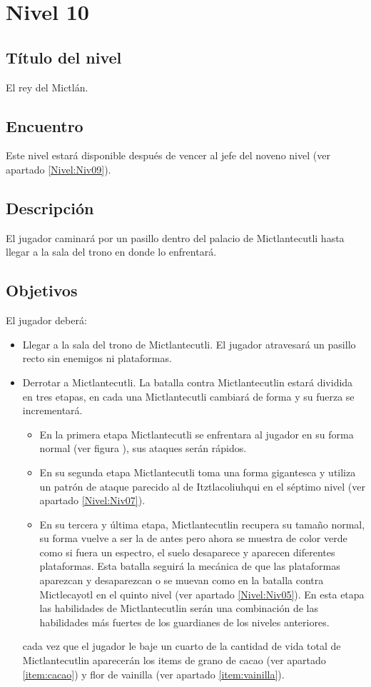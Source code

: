 \section{Nivel 10} \label{Nivel:Niv10}
	\subsection{Título del nivel}
	El rey del Mictlán.
	\subsection{Encuentro}
	Este nivel estará disponible después de vencer al jefe del noveno nivel (ver apartado \ref{Nivel:Niv09}). 
	\subsection{Descripción}
	El jugador caminará por un pasillo dentro del palacio de Mictlantecutli hasta llegar a la sala del trono en donde lo enfrentará.
	\subsection{Objetivos}
	El jugador deberá:
	\begin{itemize}
		\item Llegar a la sala del trono de Mictlantecutli. El jugador atravesará un pasillo recto sin enemigos ni plataformas. 
		\item Derrotar a Mictlantecutli. La batalla contra Mictlantecutlin estará dividida en tres etapas, en cada una Mictlantecutli cambiará de forma y su fuerza se incrementará. 
		\begin{itemize}
			\item En la primera etapa Mictlantecutli se enfrentara al jugador en su forma normal (ver figura ), sus ataques serán rápidos. 
			\item En su segunda etapa Mictlantecutli toma una forma gigantesca y utiliza un patrón de ataque parecido al de Itztlacoliuhqui en el séptimo nivel (ver apartado \ref {Nivel:Niv07}). 
			\item En su tercera y última etapa, Mictlantecutlin recupera su tamaño normal, su forma vuelve a ser la de antes pero ahora se muestra de color verde como si fuera un espectro, el suelo desaparece y aparecen diferentes plataformas. Esta batalla seguirá la mecánica de que las plataformas aparezcan y desaparezcan o se muevan como en la batalla contra Mictlecayotl en el quinto nivel (ver apartado \ref {Nivel:Niv05}). En esta etapa las habilidades de Mictlantecutlin serán una combinación de las habilidades más fuertes de los guardianes de los niveles anteriores.
		\end{itemize}
		cada vez que el jugador le baje un cuarto de la cantidad de vida total de Mictlantecutlin aparecerán los items  de grano de cacao (ver apartado \ref{item:cacao}) y flor de vainilla (ver apartado \ref{item:vainilla}).
	\end{itemize}
